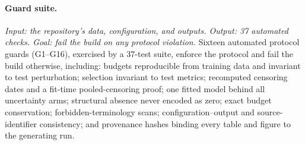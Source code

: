 \paragraph{Guard suite.}
\emph{Input: the repository's data, configuration, and outputs. Output:
37 automated checks. Goal: fail the build on any protocol violation.}
Sixteen automated protocol guards (G1--G16), exercised by a 37-test suite,
enforce the protocol and fail the build
otherwise, including: budgets reproducible from training data and
invariant to test perturbation; selection invariant to test metrics;
recomputed censoring dates and a fit-time pooled-censoring proof; one
fitted model behind all uncertainty arms; structural absence never
encoded as zero; exact budget conservation; forbidden-terminology scans;
configuration--output and source-identifier consistency; and provenance
hashes binding every table and figure to the generating run.
